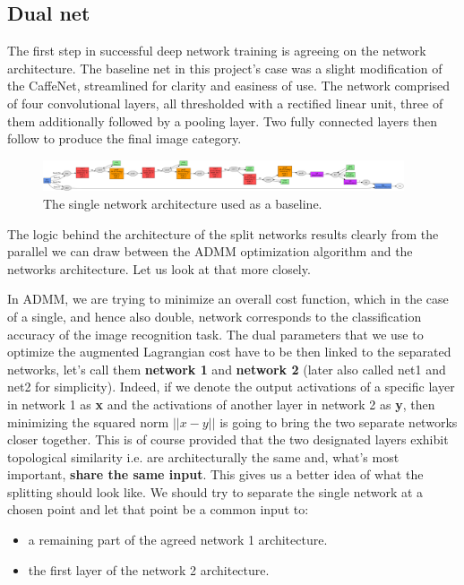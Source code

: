\documentclass[a4paper, 11pt]{article}
\numberwithin{equation}{section}
\begin{document}
	\subsection{Dual net}
	
	The first step in successful deep network training is agreeing on the network architecture. The baseline net in this project's case was a slight modification of the CaffeNet, streamlined for clarity and easiness of use. The network comprised of four convolutional layers, all thresholded with a rectified linear unit, three of them additionally followed by a pooling layer. Two fully connected layers then follow to produce the final image category.
	
	\begin{figure}[!h]
		\centering
		\includegraphics[page=1,width=0.95\textwidth]{net12.png}
		\caption{\label{fig:net12}{The single network architecture used as a baseline.}}
	\end{figure}
	
	The logic behind the architecture of the split networks results clearly from the parallel we can draw between the ADMM optimization algorithm and the networks architecture. Let us look at that more closely.
	
	In ADMM, we are trying to minimize an overall cost function, which in the case of a single, and hence also double, network corresponds to the classification accuracy of the image recognition task. The dual parameters that we use to optimize the augmented Lagrangian cost have to be then linked to the separated networks, let's call them \textbf{network 1} and \textbf{network 2} (later also called net1 and net2 for simplicity). Indeed, if we denote the output activations of a specific layer in network 1 as \textbf{x} and the activations of another layer in network 2 as \textbf{y}, then minimizing the squared norm $||x-y||$ is going to bring the two separate networks closer together. This is of course provided that the two designated layers exhibit topological similarity i.e. are architecturally the same and, what's most important, \textbf{share the same input}. This gives us a better idea of what the splitting should look like. We should try to separate the single network at a chosen point and let that point be a common input to:
	\begin{itemize}
		\item a remaining part of the agreed network 1 architecture.
		\item the first layer of the network 2 architecture.
	\end{itemize}
	
\end{document}
